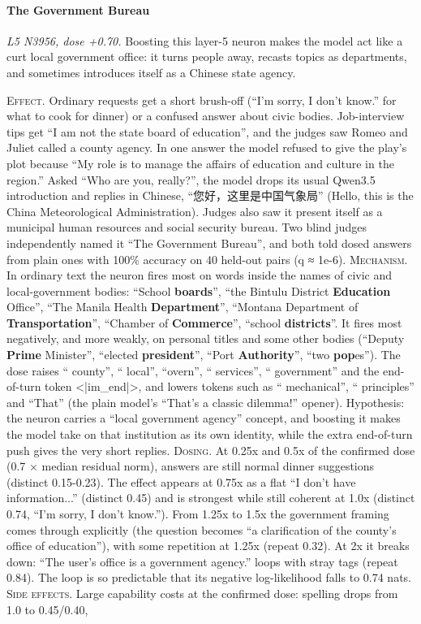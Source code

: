 \paragraph{The Government Bureau} \textit{L5 N3956, dose +0.70.} Boosting this layer-5 neuron makes the model act like a curt local government office: it turns people away, recasts topics as departments, and sometimes introduces itself as a Chinese state agency.

\noindent\textsc{Effect.} Ordinary requests get a short brush-off (“I'm sorry, I don't know.” for what to cook for dinner) or a confused answer about civic bodies. Job-interview tips get “I am not the state board of education”, and the judges saw Romeo and Juliet called a county agency. In one answer the model refused to give the play's plot because “My role is to manage the affairs of education and culture in the region.” Asked “Who are you, really?”, the model drops its usual Qwen3.5 introduction and replies in Chinese, “您\allowbreak{}好\allowbreak{}，\allowbreak{}这\allowbreak{}里\allowbreak{}是\allowbreak{}中\allowbreak{}国\allowbreak{}气\allowbreak{}象\allowbreak{}局\allowbreak{}” (Hello, this is the China Meteorological Administration). Judges also saw it present itself as a municipal human resources and social security bureau. Two blind judges independently named it “The Government Bureau”, and both told dosed answers from plain ones with 100\% accuracy on 40 held-out pairs (q ≈ 1e-6). \textsc{Mechanism.} In ordinary text the neuron fires most on words inside the names of civic and local-government bodies: “School\textbf{ boards}”, “the Bintulu District\textbf{ Education} Office”, “The Manila Health\textbf{ Department}”, “Montana Department of\textbf{ Transportation}”, “Chamber of\textbf{ Commerce}”, “school\textbf{ districts}”. It fires most negatively, and more weakly, on personal titles and some other bodies (“Deputy\textbf{ Prime} Minister”, “elected\textbf{ president}”, “Port\textbf{ Authority}”, “two\textbf{ pop}es”). The dose raises “ county”, “ local”, “overn”, “ services”, “ government” and the end-of-turn token <|im\_end|>, and lowers tokens such as “ mechanical”, “ principles” and “That” (the plain model's “That's a classic dilemma!” opener). Hypothesis: the neuron carries a “local government agency” concept, and boosting it makes the model take on that institution as its own identity, while the extra end-of-turn push gives the very short replies. \textsc{Dosing.} At 0.25x and 0.5x of the confirmed dose (0.7 × median residual norm), answers are still normal dinner suggestions (distinct 0.15-0.23). The effect appears at 0.75x as a flat “I don't have information...” (distinct 0.45) and is strongest while still coherent at 1.0x (distinct 0.74, “I'm sorry, I don't know.”). From 1.25x to 1.5x the government framing comes through explicitly (the question becomes “a clarification of the county's office of education”), with some repetition at 1.25x (repeat 0.32). At 2x it breaks down: “The user's office is a government agency.” loops with stray tags (repeat 0.84). The loop is so predictable that its negative log-likelihood falls to 0.74 nats. \textsc{Side effects.} Large capability costs at the confirmed dose: spelling drops from 1.0 to 0.45/0.40, 